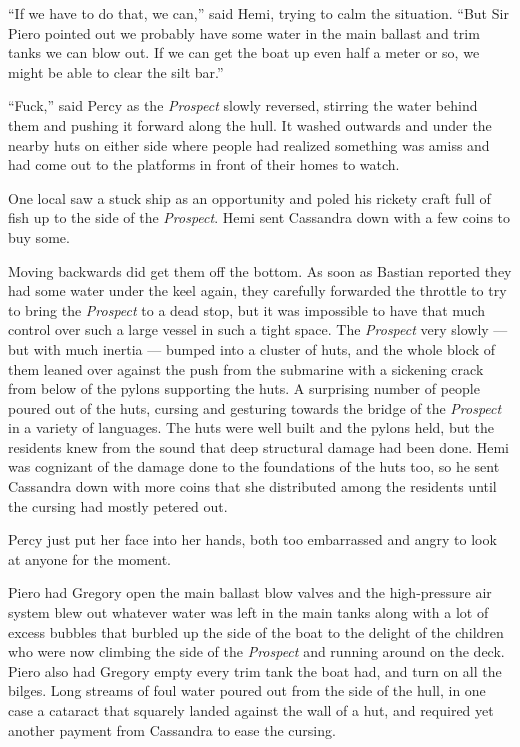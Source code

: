 \documentclass[
]{scrbook}
\begin{document}
``If we have to do that, we can,'' said Hemi, trying to calm the
situation. ``But Sir Piero pointed out we probably have some water in
the main ballast and trim tanks we can blow out. If we can get the boat
up even half a meter or so, we might be able to clear the silt bar.''

``Fuck,'' said Percy as the \emph{Prospect} slowly reversed, stirring
the water behind them and pushing it forward along the hull. It washed
outwards and under the nearby huts on either side where people had
realized something was amiss and had come out to the platforms in front
of their homes to watch.

One local saw a stuck ship as an opportunity and poled his rickety craft
full of fish up to the side of the \emph{Prospect}. Hemi sent Cassandra
down with a few coins to buy some.

Moving backwards did get them off the bottom. As soon as Bastian
reported they had some water under the keel again, they carefully
forwarded the throttle to try to bring the \emph{Prospect} to a dead
stop, but it was impossible to have that much control over such a large
vessel in such a tight space. The \emph{Prospect} very slowly --- but
with much inertia --- bumped into a cluster of huts, and the whole block
of them leaned over against the push from the submarine with a sickening
crack from below of the pylons supporting the huts. A surprising number
of people poured out of the huts, cursing and gesturing towards the
bridge of the \emph{Prospect} in a variety of languages. The huts were
well built and the pylons held, but the residents knew from the sound
that deep structural damage had been done. Hemi was cognizant of the
damage done to the foundations of the huts too, so he sent Cassandra
down with more coins that she distributed among the residents until the
cursing had mostly petered out.

Percy just put her face into her hands, both too embarrassed and angry
to look at anyone for the moment.

Piero had Gregory open the main ballast blow valves and the
high-pressure air system blew out whatever water was left in the main
tanks along with a lot of excess bubbles that burbled up the side of the
boat to the delight of the children who were now climbing the side of
the \emph{Prospect} and running around on the deck. Piero also had
Gregory empty every trim tank the boat had, and turn on all the bilges.
Long streams of foul water poured out from the side of the hull, in one
case a cataract that squarely landed against the wall of a hut, and
required yet another payment from Cassandra to ease the cursing.
\end{document}
